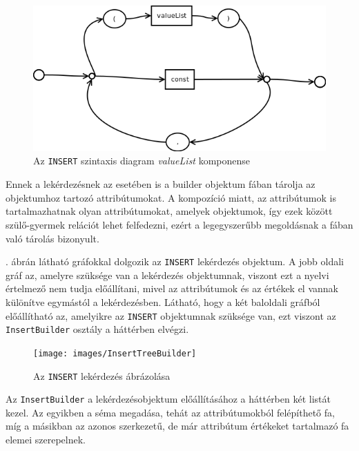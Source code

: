 \begin{figure}[htb]
	\begin{center}
		\includegraphics[scale=0.4]{images/valueList}
		\caption{Az \texttt{INSERT} szintaxis diagram \textit{valueList} komponense}
		\label{fig:valueListSytnax}
	\end{center}
\end{figure}

Ennek a lekérdezésnek az esetében is a builder objektum fában tárolja az objektumhoz tartozó attribútumokat. A kompozíció miatt, az attribútumok is tartalmazhatnak olyan attribútumokat, amelyek objektumok, így ezek között szülő-gyermek relációt lehet felfedezni, ezért a legegyszerűbb megoldásnak a fában való tárolás bizonyult.

. ábrán látható gráfokkal dolgozik az \texttt{INSERT} lekérdezés objektum. A jobb oldali gráf az, amelyre szüksége van a lekérdezés objektumnak, viszont ezt a nyelvi értelmező nem tudja előállítani, mivel az attribútumok és az értékek el vannak különítve egymástól a lekérdezésben. Látható, hogy a két baloldali gráfból előállítható az, amelyikre az \texttt{INSERT} objektumnak szüksége van, ezt viszont az \texttt{InsertBuilder} osztály a háttérben elvégzi.

\begin{figure}[htb]
	\begin{center}
		\texttt{[image: images/InsertTreeBuilder]}
		\caption{Az \texttt{INSERT} lekérdezés ábrázolása}
		\label{fig:insertTreeBuilder}
	\end{center}
\end{figure}

Az \texttt{InsertBuilder} a lekérdezésobjektum előállításához a háttérben két listát kezel. Az egyikben a séma megadása, tehát az attribútumokból felépíthető fa, míg a másikban az azonos szerkezetű, de már attribútum értékeket tartalmazó fa elemei szerepelnek.

